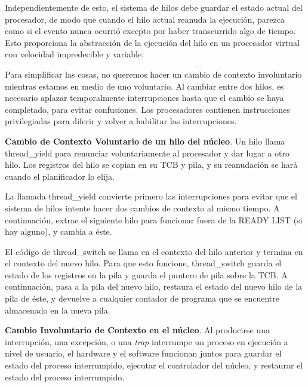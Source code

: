 \documentclass[10pt]{book}
\begin{document}
Independientemente de esto, el sistema de hilos debe guardar el estado actual del procesador, de modo que cuando el hilo actual reanuda la ejecución, parezca como si el evento nunca ocurrió excepto por haber transcurrido algo de tiempo. Esto proporciona la abstracción de la ejecución del hilo en un procesador virtual con velocidad impredecible y variable.

Para simplificar las cosas, no queremos hacer un cambio de contexto involuntario mientras estamos en medio de uno voluntario. Al cambiar entre dos hilos, es necesario aplazar temporalmente interrupciones hasta que el cambio se haya completado, para evitar confusiones. Los procesadores contienen instrucciones privilegiadas para diferir y volver a habilitar las interrupciones.

\textbf{Cambio de Contexto Voluntario de un hilo del núcleo}. Un hilo llama {\mf thread\_yield} para renunciar voluntariamente al procesador y dar lugar a otro hilo. Los registros del hilo se copian en su TCB y pila, y su reanudación se hará cuando el planificador lo elija.

La llamada {\mf thread\_yield} convierte primero las interrupciones para evitar que el sistema de hilos intente hacer dos cambios de contexto al mismo tiempo. A continuación, extrae el siguiente hilo para funcionar fuera de la READY LIST (si hay alguno), y cambia a éste.

El código de {\mf thread\_switch} se llama en el contexto del hilo anterior y termina en el contexto del nuevo hilo. Para que esto funcione, {\mf thread\_switch} guarda el estado de los registros en la pila y guarda el puntero de pila sobre la TCB. A continuación, pasa a la pila del nuevo hilo, restaura el estado del nuevo hilo de la pila de éste, y devuelve a cualquier contador de programa que se encuentre almacenado en la nueva pila.

\textbf{Cambio Involuntario de Contexto en el núcleo}. Al producirse una interrupción, una excepción, o una \textit{trap} interrumpe un proceso en ejecución a nivel de usuario, el hardware y el software funcionan juntos para guardar el estado del proceso interrumpido, ejecutar el controlador del núcleo, y restaurar el estado del proceso interrumpido.
\end{document}
